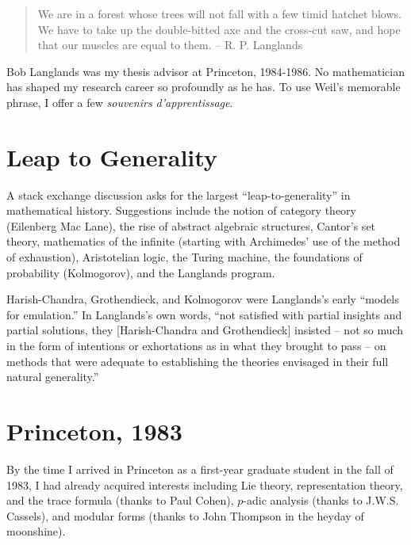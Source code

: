 
\begin{quote}
  We are in a forest whose trees will not fall with a few
  timid hatchet blows.  We have to take up the double-bitted
  axe and the cross-cut saw, and hope that our muscles are
  equal to them.  -- R. P. Langlands
  \end{quote}

Bob Langlands was my thesis advisor at Princeton, 1984-1986.  No
mathematician has shaped my research career so profoundly as he has.
To use Weil's memorable phrase, I offer a few {\it souvenirs
  d'apprentissage}.

\section{Leap to Generality}

A stack exchange discussion asks for the largest
``leap-to-generality'' in mathematical history.  Suggestions include
the notion of category theory (Eilenberg Mac Lane), the rise of
abstract algebraic structures, Cantor's set theory, mathematics of the
infinite (starting with Archimedes' use of the method of exhaustion),
Aristotelian logic, the Turing machine, the foundations of probability
(Kolmogorov), and the Langlands program.



Harish-Chandra, Grothendieck, and Kolmogorov were Langlands's early
``models for emulation.''  In Langlands's own words, ``not satisfied
with partial insights and partial solutions, they [Harish-Chandra and
  Grothendieck] insisted -- not so much in the form of intentions or
exhortations as in what they brought to pass -- on methods that were
adequate to establishing the theories envisaged in their full natural
generality.''

\section{Princeton, 1983}

By the time I arrived in Princeton as a first-year graduate student in
the fall of 1983, I had already acquired interests including Lie theory,
representation theory, and the trace formula (thanks to Paul Cohen),
$p$-adic analysis (thanks to J.W.S. Cassels), and modular forms
(thanks to John Thompson in the heyday of moonshine).

